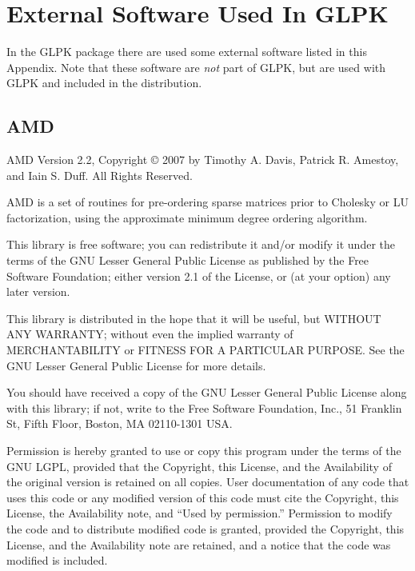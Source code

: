 
\chapter{External Software Used In GLPK}

In the GLPK package there are used some external software listed in
this Appendix. Note that these software are {\it not} part of GLPK, but
are used with GLPK and included in the distribution.


\section{AMD}

\noindent
AMD Version 2.2, Copyright {\copyright} 2007 by Timothy A. Davis,
Patrick R. Amestoy, and Iain S. Duff.  All Rights Reserved.


AMD is a set of routines for pre-ordering sparse matrices prior to
Cholesky or LU factorization, using the approximate minimum degree
ordering algorithm.


This library is free software; you can redistribute it and/or
modify it under the terms of the GNU Lesser General Public License
as published by the Free Software Foundation; either version 2.1 of
the License, or (at your option) any later version.

This library is distributed in the hope that it will be useful,
but WITHOUT ANY WARRANTY; without even the implied warranty of
MERCHANTABILITY or FITNESS FOR A PARTICULAR PURPOSE.  See the GNU
Lesser General Public License for more details.

You should have received a copy of the GNU Lesser General Public
License along with this library; if not, write to the Free Software
Foundation, Inc., 51 Franklin St, Fifth Floor, Boston, MA 02110-1301
USA.

Permission is hereby granted to use or copy this program under the
terms of the GNU LGPL, provided that the Copyright, this License,
and the Availability of the original version is retained on all
copies.  User documentation of any code that uses this code or any
modified version of this code must cite the Copyright, this License,
the Availability note, and ``Used by permission.''  Permission to
modify the code and to distribute modified code is granted, provided
the Copyright, this License, and the Availability note are retained,
and a notice that the code was modified is included.

